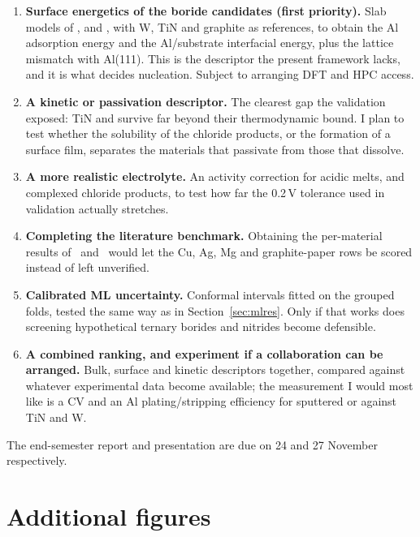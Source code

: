 \begin{enumerate}[leftmargin=*,itemsep=3pt]
\item \textbf{Surface energetics of the boride candidates (first priority).} Slab models of ,  and , with W, TiN and graphite as references, to obtain the Al adsorption energy and the Al/substrate interfacial energy, plus the lattice mismatch with Al(111). This is the descriptor the present framework lacks, and it is what decides nucleation. Subject to arranging DFT and HPC access.
\item \textbf{A kinetic or passivation descriptor.} The clearest gap the validation exposed: TiN and  survive far beyond their thermodynamic bound. I plan to test whether the solubility of the chloride products, or the formation of a surface film, separates the materials that passivate from those that dissolve.
\item \textbf{A more realistic electrolyte.} An  activity correction for acidic melts, and complexed chloride products, to test how far the 0.2\,V tolerance used in validation actually stretches.
\item \textbf{Completing the literature benchmark.} Obtaining the per-material results of~\citep{WangL2021} and~\citep{Shi2019} would let the Cu, Ag, Mg and graphite-paper rows be scored instead of left unverified.
\item \textbf{Calibrated ML uncertainty.} Conformal intervals fitted on the grouped folds, tested the same way as in Section~\ref{sec:mlres}. Only if that works does screening hypothetical ternary borides and nitrides become defensible.
\item \textbf{A combined ranking, and experiment if a collaboration can be arranged.} Bulk, surface and kinetic descriptors together, compared against whatever experimental data become available; the measurement I would most like is a CV and an Al plating/stripping efficiency for sputtered  or  against TiN and W.
\end{enumerate}

\noindent The end-semester report and presentation are due on 24 and 27 November respectively.





\appendix
\section{Additional figures}

